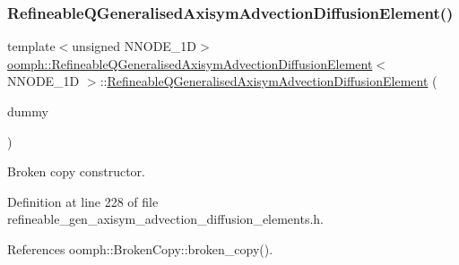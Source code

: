 \mbox{\label{classoomph_1_1RefineableQGeneralisedAxisymAdvectionDiffusionElement_a71fb2c7254b11bb8a0ebffa6f4e74f33}} 
\subsubsection{\texorpdfstring{Refineable\+Q\+Generalised\+Axisym\+Advection\+Diffusion\+Element()}{RefineableQGeneralisedAxisymAdvectionDiffusionElement()}\hspace{0.1cm}{\footnotesize\ttfamily [2/2]}}
{\footnotesize\ttfamily template$<$unsigned N\+N\+O\+D\+E\+\_\+1D$>$ \\
\hyperlink{classoomph_1_1RefineableQGeneralisedAxisymAdvectionDiffusionElement}{oomph\+::\+Refineable\+Q\+Generalised\+Axisym\+Advection\+Diffusion\+Element}$<$ N\+N\+O\+D\+E\+\_\+1D $>$\+::\hyperlink{classoomph_1_1RefineableQGeneralisedAxisymAdvectionDiffusionElement}{Refineable\+Q\+Generalised\+Axisym\+Advection\+Diffusion\+Element} (\begin{DoxyParamCaption}\item[{const \hyperlink{classoomph_1_1RefineableQGeneralisedAxisymAdvectionDiffusionElement}{Refineable\+Q\+Generalised\+Axisym\+Advection\+Diffusion\+Element}$<$ N\+N\+O\+D\+E\+\_\+1D $>$ \&}]{dummy }\end{DoxyParamCaption})\hspace{0.3cm}{\ttfamily [inline]}}



Broken copy constructor. 



Definition at line 228 of file refineable\+\_\+gen\+\_\+axisym\+\_\+advection\+\_\+diffusion\+\_\+elements.\+h.



References oomph\+::\+Broken\+Copy\+::broken\+\_\+copy().



